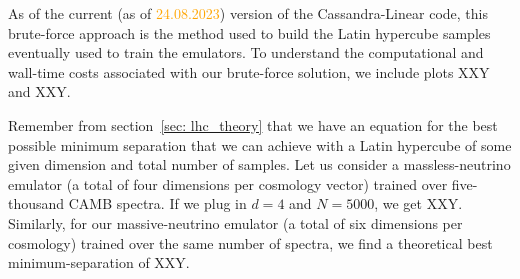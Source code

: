 \begin{comment}
The \verb|cdist| function can be re-used to compare LHSs loaded from 
different
files. However, since there is generally little reason to keep old LHSs
(except, perhaps, to reconstruct specific emulators), it reduces clutter to
simply continue overwriting the same file. Therefore, the function
\verb|multithread_unit_LHC_builder| also includes a parameter
\verb|previous_record|, which is recommended whenever the user would like to
stop the function and then resume it later. In such a case, the parameter
should be set to the \verb|cdist| value of the exis}
\end{comment}



As of the current (as of \textcolor{orange}{24.08.2023}) version of the
Cassandra-Linear code, this brute-force approach is the method used to build
the Latin hypercube samples eventually used to train the emulators. To 
understand the computational and wall-time costs associated with our
brute-force solution, we include plots XXY and XXY.

\begin{comment} %
we left the system to run for three consecutive days. In this time, the 
largest minimum separation that we generated was approximately 0.08022.  
Recall from section sec_B1 that the theoretical best possible value for this 
setup is approximately 0.24183. It would have been more meaningful if you had 
counted the total number of function calls, but it isn’t too late to set up 
such a run. So, even after assigning a relatively large amount of compute to 
this brute force solution, we fail to obtain an LHC of even a third of the 
best minimum separation.
\end{comment} 

Remember from section~\ref{sec: lhc_theory} that we have an equation for the
best possible minimum separation that we can achieve with a Latin hypercube
of some given dimension and total number of samples. Let us consider a massless-neutrino emulator (a total of four dimensions per cosmology vector)
trained over five-thousand CAMB spectra. If we plug in $d = 4$ and $N=5000$,
we get XXY. Similarly, for our massive-neutrino emulator (a total of six 
dimensions per cosmology) trained over the same number of spectra, we find a 
theoretical best minimum-separation of XXY. 

